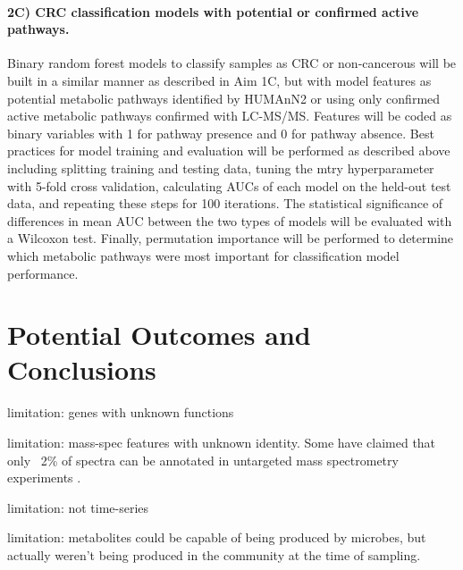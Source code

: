 \documentclass[11pt]{article}
\begin{document}
\paragraph{2C) CRC classification models with potential or confirmed active pathways.}

Binary random forest models to classify samples as CRC or non-cancerous will be built in a similar manner as described in Aim 1C, but with model features as potential metabolic pathways identified by HUMAnN2 or using only confirmed active metabolic pathways confirmed with LC-MS/MS.
Features will be coded as binary variables with 1 for pathway presence and 0 for pathway absence.
Best practices for model training and evaluation will be performed as described above including splitting training and testing data, tuning the mtry hyperparameter with 5-fold cross validation, calculating AUCs of each model on the held-out test data, and repeating these steps for 100 iterations.
The statistical significance of differences in mean AUC between the two types of models will be evaluated with a Wilcoxon test.
Finally, permutation importance will be performed to determine which metabolic pathways were most important for classification model performance.

\section*{Potential Outcomes and Conclusions}

limitation: genes with unknown functions

limitation: mass-spec features with unknown identity. Some have claimed that only ~2\% of spectra can be annotated in untargeted mass spectrometry experiments \cite{de_silva_illuminating_2015}.

limitation: not time-series

limitation: metabolites could be capable of being produced by microbes, but actually weren't being produced in the community at the time of sampling.

\pagebreak
\footnotesize{

\par}
\end{document}
